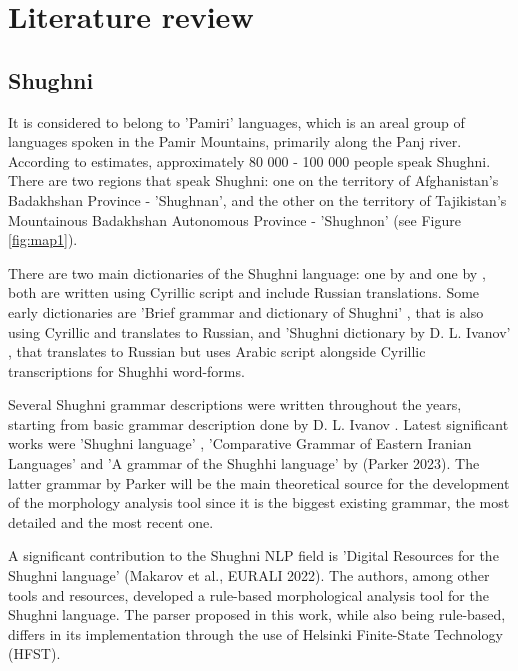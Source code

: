 \section{Literature review}
\subsection{Shughni}
\par It is considered to belong to 'Pamiri' languages, which is an areal group of languages spoken in the Pamir Mountains, primarily along the Panj river. According to \textcite{edelman_dodykhudoeva_shughni_2009} estimates, approximately 80 000 - 100 000 people speak Shughni. There are two regions that speak Shughni: one on the territory of Afghanistan's Badakhshan Province - 'Shughnan', and the other on the territory of Tajikistan's Mountainous Badakhshan Autonomous Province - 'Shughnon' \parencite[2]{parker_shughni_2023} (see Figure \ref{fig:map1}).
\par There are two main dictionaries of the Shughni language: one by \textcite{zarubin_dict_1960} and one by \textcite{karamshoev_dict_1988}, both are written using Cyrillic script and include Russian translations. Some early dictionaries are 'Brief grammar and dictionary of Shughni' \parencite{tumanovich_gram_1906}, that is also using Cyrillic and translates to Russian, and 'Shughni dictionary by D. L. Ivanov' \parencite{salemann_dict_1895}, that translates to Russian but uses Arabic script alongside Cyrillic transcriptions for Shughhi word-forms.
\par Several Shughni grammar descriptions were written throughout the years, starting from basic grammar description done by D. L. Ivanov \parencite[274-281]{salemann_dict_1895}. Latest significant works were 'Shughni language' \parencite[225-242]{edelman_languages_1999}, 'Comparative Grammar of Eastern Iranian Languages' \parencite{edelman_gram_2009} and 'A grammar of the Shughhi language' by (Parker 2023). The latter grammar by Parker will be the main theoretical source for the development of the morphology analysis tool since it is the biggest existing grammar, the most detailed and the most recent one.
\par A significant contribution to the Shughni NLP field is 'Digital Resources for the Shughni language' (Makarov et al., EURALI 2022). The authors, among other tools and resources, developed a rule-based morphological analysis tool for the Shughni language. The parser proposed in this work, while also being rule-based, differs in its implementation through the use of Helsinki Finite-State Technology (HFST).

